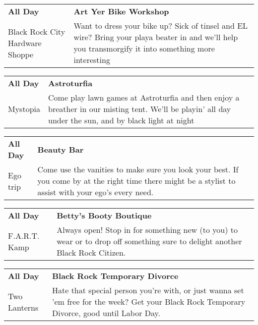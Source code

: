 \begin{tabular}{ p{1in} p{2.2in} }
    \textbf{All Day} & \textbf{Art Yer Bike Workshop} \\
    Black Rock City Hardware Shoppe \newline  & Want to dress your bike up?  Sick of tinsel and EL wire? Bring your playa beater in and we'll help you transmorgify it into something more interesting \\
    \hline 
\end{tabular}
    
\begin{tabular}{ p{1in} p{2.2in} }
    \textbf{All Day} & \textbf{Astroturfia} \\
    Mystopia \newline  & Come play lawn games at Astroturfia and then enjoy a breather in our misting tent. We'll be playin' all day under the sun, and by black light at night \\
    \hline 
\end{tabular}
    
\begin{tabular}{ p{1in} p{2.2in} }
    \textbf{All Day} & \textbf{Beauty Bar} \\
    Ego trip \newline  & Come use the vanities to make sure you look your best. If you come by at the right time there might be a stylist to assist with your ego's every need. \\
    \hline 
\end{tabular}
    
\begin{tabular}{ p{1in} p{2.2in} }
    \textbf{All Day} & \textbf{Betty's Booty Boutique} \\
    F.A.R.T. Kamp \newline  & Always open! Stop in for something new (to you) to wear or to drop off something sure to delight another Black Rock Citizen. \\
    \hline 
\end{tabular}
    
\begin{tabular}{ p{1in} p{2.2in} }
    \textbf{All Day} & \textbf{Black Rock Temporary Divorce} \\
    Two Lanterns \newline  & Hate that special person you're with, or just wanna set 'em free for the
week? Get your Black Rock Temporary Divorce, good until Labor Day. \\
    \hline 
\end{tabular}
    
